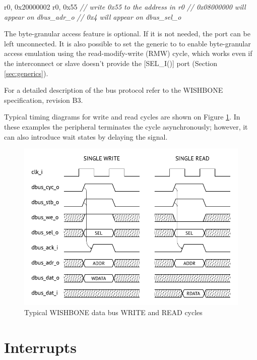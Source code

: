 \documentclass[a4paper,12pt,twoside,extrafontsizes]{memoir}
\begin{document}
\begin{codeparbreakable}
     r0, 0x20000002
     r0, 0x55
\emph{// write 0x55 to the address in r0}
\emph{// 0x08000000 will appear on dbus_adr_o}
\emph{// 0x4 will appear on dbus_sel_o}
\end{codeparbreakable}

The byte-granular access feature is optional. If it is not needed, the  port can be left unconnected. It is also possible to set the  generic to  to enable byte-granular access emulation using the read-modify-write (RMW) cycle, which works even if the interconnect or slave doesn't provide the [SEL\_I()] port (Section \ref{sec:generics}).

For a detailed description of the bus protocol refer to the WISHBONE specification, revision B3.

Typical timing diagrams for write and read cycles are shown on Figure \ref{fig:dbustiming}. In these examples the peripheral terminates the cycle asynchronously; however, it can also introduce wait states by delaying the  signal.

\begin{figure}[htbp]
	\centering
	\includegraphics[scale=0.928]{images/dbustiming.pdf}
	\caption{Typical WISHBONE data bus WRITE and READ cycles}
	\label{fig:dbustiming}
\end{figure}

\section{Interrupts}
\label{sec:interrupts}
\end{document}
